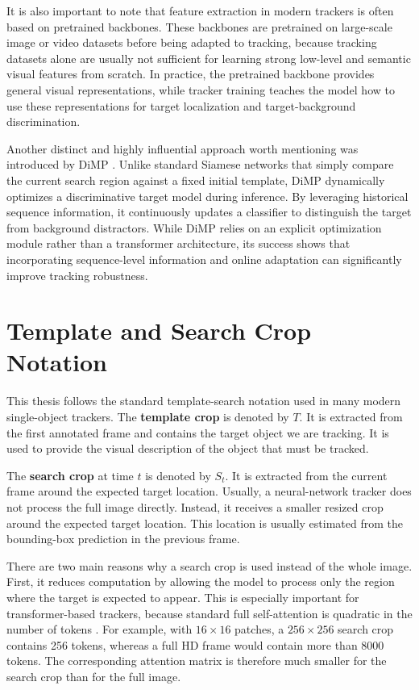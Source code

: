 \documentclass[bachelorthesis]{fer}
\numberwithin{equation}{chapter}
\begin{document}
    It is also important to note that feature extraction in modern trackers is often based
    on pretrained backbones. These backbones are pretrained on large-scale image or video
    datasets before being adapted to tracking, because tracking datasets
    alone are usually not sufficient for learning strong low-level and semantic visual
    features from scratch. In practice, the pretrained backbone provides general visual
    representations, while tracker training teaches the model how to use these
    representations for target localization and target-background discrimination.

    Another distinct and highly influential approach worth mentioning was introduced by DiMP \cite{bhat2019dimp}. Unlike standard Siamese networks that simply compare the current search region against a fixed initial template, DiMP dynamically optimizes a discriminative target model during inference. By leveraging historical sequence information, it continuously updates a classifier to distinguish the target from background distractors. While DiMP relies on an explicit optimization module rather than a transformer architecture, its success shows that incorporating sequence-level information and online adaptation can significantly improve tracking robustness.


    \section{Template and Search Crop Notation}\label{template-and-search-crop-notation}

    This thesis follows the standard template-search notation used in many modern
    single-object trackers. The \textbf{template crop} is denoted by \(T\). It is extracted from
    the first annotated frame and contains the target object we are tracking.
    It is used to provide the visual description of the object that must be tracked.

    The \textbf{search crop} at time \(t\) is denoted by \(S_t\). It is extracted from the
    current frame around the expected target location. Usually, a neural-network tracker does not process the full image
    directly.
    Instead, it receives a smaller resized crop around the expected target location.
    This location is usually estimated from the bounding-box prediction in the previous frame.

    There are two main reasons why a search crop is used instead of the whole image. First,
    it reduces computation by allowing the model to process only the region where the target
    is expected to appear. This is especially important for transformer-based trackers,
    because standard full self-attention is quadratic in the number of tokens \cite{vaswani2017attention}. For
    example, with \(16 \times 16\) patches, a \(256 \times 256\) search crop contains 256
    tokens, whereas a full HD frame would contain more than 8000 tokens. The corresponding
    attention matrix is therefore much smaller for the search crop than for the full image.
\end{document}
